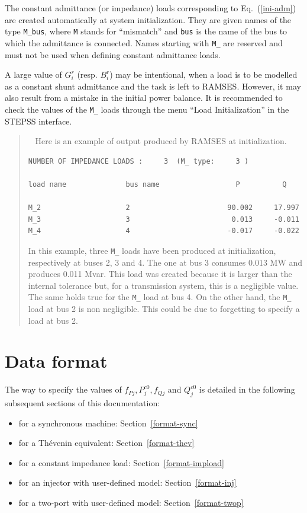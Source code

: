 The constant admittance (or impedance) loads corresponding to Eq.~(\ref{ini-adm}) are created automatically at system initialization. They are given names of the type {\tt M\_bus}, where {\tt M} stands for ``mismatch'' and {\tt bus} is the name of the bus to which the admittance is connected. Names starting with {\tt M\_} are reserved and must not be used when defining constant admittance loads.

A large value of $G_i^r$ (resp. $B_i^r$) may be intentional, when a load is to be modelled as a constant shunt admittance and the task is left to RAMSES. However, it may also result from a mistake in the initial power balance. It is recommended to check the values of the {\tt M\_} loads through the menu ``Load Initialization'' in the STEPSS interface.

\vspace*{-2ex}
\begin{quote}
\faHandPointRight ~ Here is an example of output produced by RAMSES at initialization.
\vspace*{-2ex}
\begin{verbatim}
NUMBER OF IMPEDANCE LOADS :     3  (M_ type:     3 )

load name              bus name                  P          Q

M_2                    2                       90.002     17.997
M_3                    3                        0.013     -0.011
M_4                    4                       -0.017     -0.022

\end{verbatim}
In this example, three {\tt M\_} loads have been produced at initialization, respectively at buses 2, 3 and 4. The one at bus 3 consumes 0.013 MW and produces 0.011 Mvar. This load was created because it is larger than the internal tolerance but, for a transmission system, this is a negligible value. The same holds true for the {\tt M\_} load at bus 4. On the other hand, the {\tt M\_} load at bus 2 is non negligible. This could be due to forgetting to specify a load at bus 2.
\end{quote}

\section{Data format}

The way to specify the values of $f_{Pj}, P^{c0}_j, f_{Qj}$ and $Q^{c0}_j$ is detailed in the following subsequent sections of this documentation:
\begin{itemize}
\item for a synchronous machine: Section~\ref{format-sync}
\item for a Th\'{e}venin equivalent: Section~\ref{format-thev}
\item for a constant impedance load: Section~\ref{format-impload}
\item for an injector with user-defined model: Section~\ref{format-inj}
\item for a two-port with user-defined model: Section~\ref{format-twop}
\end{itemize}


 